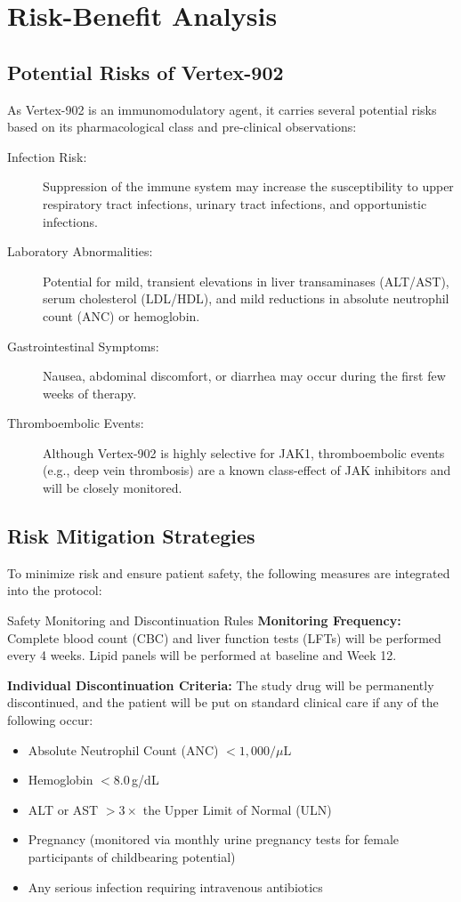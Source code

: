 \section{Risk-Benefit Analysis}

\subsection{Potential Risks of Vertex-902}
As Vertex-902 is an immunomodulatory agent, it carries several potential risks based on its pharmacological class and pre-clinical observations:
\begin{description}
    \item[Infection Risk:] Suppression of the immune system may increase the susceptibility to upper respiratory tract infections, urinary tract infections, and opportunistic infections.
    \item[Laboratory Abnormalities:] Potential for mild, transient elevations in liver transaminases (ALT/AST), serum cholesterol (LDL/HDL), and mild reductions in absolute neutrophil count (ANC) or hemoglobin.
    \item[Gastrointestinal Symptoms:] Nausea, abdominal discomfort, or diarrhea may occur during the first few weeks of therapy.
    \item[Thromboembolic Events:] Although Vertex-902 is highly selective for JAK1, thromboembolic events (e.g., deep vein thrombosis) are a known class-effect of JAK inhibitors and will be closely monitored.
\end{description}

\subsection{Risk Mitigation Strategies}
To minimize risk and ensure patient safety, the following measures are integrated into the protocol:
\begin{warning-box}{Safety Monitoring and Discontinuation Rules}
    \textbf{Monitoring Frequency:} Complete blood count (CBC) and liver function tests (LFTs) will be performed every 4 weeks. Lipid panels will be performed at baseline and Week 12.
    
    \textbf{Individual Discontinuation Criteria:} The study drug will be permanently discontinued, and the patient will be put on standard clinical care if any of the following occur:
    \begin{itemize}
        \item Absolute Neutrophil Count (ANC) $< 1,000/\mu\text{L}$
        \item Hemoglobin $< 8.0$\,g/dL
        \item ALT or AST $> 3 \times$ the Upper Limit of Normal (ULN)
        \item Pregnancy (monitored via monthly urine pregnancy tests for female participants of childbearing potential)
        \item Any serious infection requiring intravenous antibiotics
    \end{itemize}
\end{warning-box}

